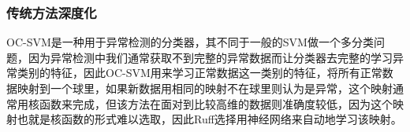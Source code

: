 





\subsubsection{传统方法深度化}

OC-SVM\cite{DBLP:journals/tdsc/WatsonSMMH16}是一种用于异常检测的分类器，其不同于一般的SVM做一个多分类问题，因为异常检测中我们通常获取不到完整的异常数据而让分类器去完整的学习异常类别的特征，因此OC-SVM用来学习正常数据这一类别的特征，将所有正常数据映射到一个球里，如果新数据用相同的映射不在球里则认为是异常，这个映射通常用核函数来完成，但该方法在面对到比较高维的数据则准确度较低，因为这个映射也就是核函数的形式难以选取，因此Ruff\cite{ruff2018deep}选择用神经网络来自动地学习该映射。

